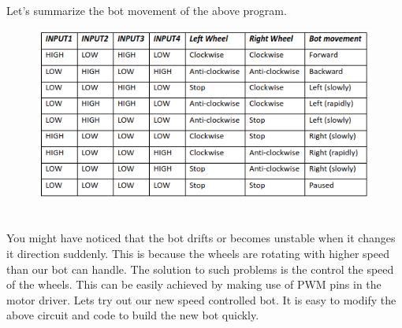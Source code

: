 Let’s summarize the bot movement of the above program.\\
\begin{figure}
    \centering
    \includegraphics{Chapters/images/md2.png}
\end{figure} \\
You might have noticed that the bot drifts or becomes unstable when it changes it direction suddenly. This is because the wheels are rotating with higher speed than our bot can handle. The solution to such problems is the control the speed of the wheels. This can be easily achieved by making use of PWM pins in the motor driver. Lets try out our new speed controlled bot. It is easy to modify the above circuit and code to build the new bot quickly.


